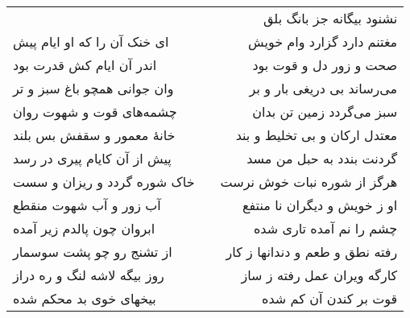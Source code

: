 \begin{center}
\begin{longtable}{l p{0.5cm} r}
&&
نشنود بیگانه جز بانگ بلق
\\
ای خنک آن را که او ایام پیش
&&
مغتنم دارد گزارد وام خویش
\\
اندر آن ایام کش قدرت بود
&&
صحت و زور دل و قوت بود
\\
وان جوانی همچو باغ سبز و تر
&&
می‌رساند بی دریغی بار و بر
\\
چشمه‌های قوت و شهوت روان
&&
سبز می‌گردد زمین تن بدان
\\
خانهٔ معمور و سقفش بس بلند
&&
معتدل ارکان و بی تخلیط و بند
\\
پیش از آن کایام پیری در رسد
&&
گردنت بندد به حبل من مسد
\\
خاک شوره گردد و ریزان و سست
&&
هرگز از شوره نبات خوش نرست
\\
آب زور و آب شهوت منقطع
&&
او ز خویش و دیگران نا منتفع
\\
ابروان چون پالدم زیر آمده
&&
چشم را نم آمده تاری شده
\\
از تشنج رو چو پشت سوسمار
&&
رفته نطق و طعم و دندانها ز کار
\\
روز بیگه لاشه لنگ و ره دراز
&&
کارگه ویران عمل رفته ز ساز
\\
بیخهای خوی بد محکم شده
&&
قوت بر کندن آن کم شده
\\
\end{longtable}
\end{center}
